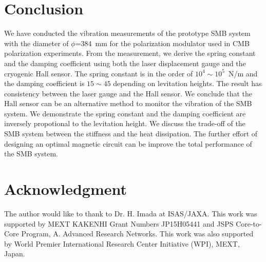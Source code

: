 \documentclass[a4paper,11pt]{jpconf}
\begin{document}
\section{Conclusion}
We have conducted the vibration measurements of the prototype SMB system with the diameter of $\phi$=384~mm for the polarization modulator used in CMB polarization experiments.
From the measurement, we derive the spring constant and the damping coefficient using both the laser displacement gauge and the cryogenic Hall sensor.
The spring constant is in the order of $10^{4} \sim 10^{5}$~N/m and the damping coefficient is $15\sim45$ depending on levitation heights.
The result has consistency between the laser gauge and the Hall sensor.
We conclude that the Hall sensor can be an alternative method to monitor the vibration of the SMB system.
We demonstrate the spring constant and the damping coefficient are inversely propotional to the levitation height.
We discuss the trade-off of the SMB system between the stiffness and the heat dissipation.
The further effort of designing an optimal magnetic circuit can be improve the total performance of the SMB system.

\section{Acknowledgment}
The author would like to thank to Dr. H. Imada at ISAS/JAXA.
This work was supported by MEXT KAKENHI Grant Numbers JP15H05441 and JSPS Core-to-Core Program, A. Advanced Research Networks.
This work was also supported by World Premier International Research Center Initiative (WPI), MEXT, Japan.
\end{document}
